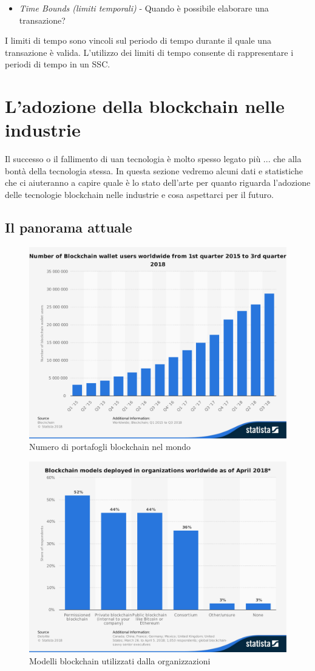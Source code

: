 \begin{itemize}
	\item \textit{Time Bounds (limiti temporali)} -
	      Quando è possibile elaborare una transazione?
\end{itemize}
I limiti di tempo sono vincoli sul periodo di tempo durante il quale
una transazione è valida. L'utilizzo dei limiti di tempo
consente di rappresentare i periodi di tempo in un SSC.

\section{L'adozione della blockchain nelle industrie}
Il successo o il fallimento di uan tecnologia è molto spesso legato più ... che alla bontà della tecnologia stessa.
In questa sezione vedremo alcuni dati e statistiche che ci aiuteranno a capire quale è
lo stato dell'arte per quanto riguarda l'adozione delle tecnologie blockchain nelle industrie
e cosa aspettarci per il futuro.

\subsection{Il panorama attuale}
\begin{figure}[H]
	\centering
	\includegraphics[width=.75\linewidth]{images/chap_intro/number-of-blockchain-wallet.pdf}
	\caption{Numero di portafogli blockchain nel mondo \cite{number-of-blockchain-wallet}}
\end{figure}
\begin{figure}[H]
	\centering
	\includegraphics[width=.75\linewidth]{images/chap_intro/model-focus-for-blockchain.pdf}
	\caption{Modelli blockchain utilizzati dalla organizzazioni \cite{model-focus-for-blockchain}}
\end{figure}


